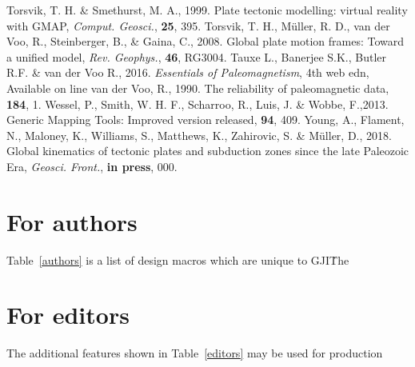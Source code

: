 \begin{thebibliography}{}
  Torsvik, T. H. \& Smethurst, M. A., 1999. Plate tectonic modelling: virtual
  reality with GMAP, \textit{Comput. Geosci.}, \textbf{25}, 395.
  Torsvik, T. H., M{\"{u}}ller, R. D., van der Voo, R., Steinberger, B., \&
  Gaina, C., 2008. Global plate motion frames: Toward a unified model,
  \textit{Rev. Geophys.}, \textbf{46}, RG3004.
  Tauxe L., Banerjee S.K., Butler R.F. \& van der Voo R., 2016.
  \textit{Essentials of Paleomagnetism}, 4th web edn, Available on line
  van der Voo, R., 1990. The reliability of paleomagnetic data,
  \tecto{}\textbf{184}, 1.
  Wessel, P., Smith, W. H. F., Scharroo, R., Luis, J. \& Wobbe, F.,2013. Generic
  Mapping Tools: Improved version released, \eos{}\textbf{94}, 409.
  Young, A., Flament, N., Maloney, K., Williams, S., Matthews, K., Zahirovic,
  S.
  \& Müller, D., 2018. Global kinematics of tectonic plates and subduction zones
  since the late Paleozoic Era, \textit{Geosci. Front.},
  \textbf{in press}, 000.
\end{thebibliography}


\appendix
\section{For authors}

Table~\ref{authors} is a list of design macros which are unique to GJI\. The

\section{For editors}

The additional features shown in Table~\ref{editors} may be used for production

\bsp{} %
~\label{lastpage}
